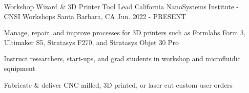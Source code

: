\begin{cventries}
\cventry
{Workshop Wizard \& 3D Printer Tool Lead} %
{California NanoSystems Institute - CNSI Workshops} %
{Santa Barbara, CA} %
{Jun. 2022 - PRESENT} %
{ %
\begin{cvitems}
\item {Manage, repair, and improve processes for 3D printers such as Formlabs Form 3, Ultimaker S5, Stratasys F270, and Stratasys Objet 30 Pro}
\item {Instruct researchers, start-ups, and grad students in workshop and microfluidic equipment}
\item {Fabricate \& deliver CNC milled, 3D printed, or laser cut custom user orders }
\end{cvitems}
}








\end{cventries}

